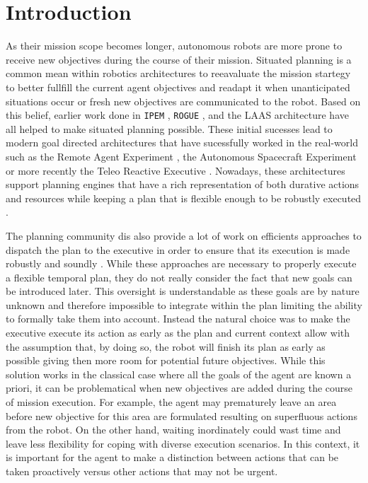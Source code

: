 
\section{Introduction}
\label{sec:intro}

As their mission scope becomes longer, autonomous robots are more
prone to receive new objectives during the course of their
mission. Situated planning is a common mean within robotics 
architectures to reeavaluate the mission startegy to
better fullfill the current agent objectives and readapt it when
unanticipated situations occur or fresh new objectives are
communicated to the robot. Based on this belief, earlier work done in
\texttt{IPEM} \cite{AmbrosIngerson88}, \texttt{ROGUE} \cite{Haigh98},
and the LAAS architecture \cite{alami:1998p820} have all helped to
make situated planning possible. These initial sucesses lead to modern
goal directed architectures that have sucessfully worked in the
real-world such as the Remote Agent Experiment \cite{mus98}, the
Autonomous Spacecraft Experiment \cite{chien99} or more recently the
Teleo Reactive Executive \cite{mcgann08b,py10}. Nowadays, these
architectures support planning engines that have a rich representation
of both durative actions and resources while keeping a plan that is
flexible enough to be robustly executed \cite{lemai04}.

The planning community dis also provide a lot of work on efficients
approaches to dispatch the plan to the executive in order to ensure
that its execution is made robustly and soundly
\cite{mus98a,morris01}. While these approaches  are necessary to
properly execute a flexible temporal plan, they do not really
consider the fact that new goals can be introduced later. This
oversight is understandable as these goals are by nature unknown and
therefore impossible to integrate within the plan limiting the ability
to formally take them into account. Instead the natural choice was to
make the executive execute its action as early as the plan and
current context allow with the assumption that, by doing so, the
robot will finish its plan as early as possible giving then more room
for potential future objectives.  While
this solution works in the classical case where all the goals of the
agent are known a priori, it can be problematical when new objectives
are added during the course of mission execution. For example, the
agent may prematurely leave an area before new objective for this area
are formulated resulting on superfluous actions from the robot. On the 
other hand, waiting inordinately could wast time and leave less
flexibility  for coping with diverse execution scenarios. In this
context,  it is important for the agent to make a  distinction between 
actions that can be taken proactively versus other actions that may
not  be urgent.  

